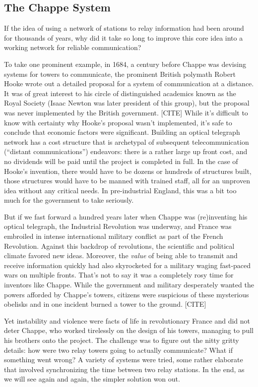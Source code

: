 \documentclass[UTF8]{book}
\begin{document}
\begin{CJK}{UTF8}{gbsn}
\subsection*{The Chappe System}

If the idea of using a network of stations to relay information had been around for thousands of years, why did it take so long to improve this core idea into a working network for reliable communication?

To take one prominent example, in 1684, a century before Chappe was devising systems for towers to communicate, the prominent British polymath Robert Hooke wrote out a detailed proposal for a system of communication at a distance. It was of great interest to his circle of distinguished academics known as the Royal Society (Isaac Newton was later president of this group), but the proposal was never implemented by the British government. [CITE] While it's difficult to know with certainty why Hooke's proposal wasn't implemented, it's safe to conclude that economic factors were significant. Building an optical telegraph network has a cost structure that is archetypal of subsequent telecommunication (``distant communications'') endeavors: there is a rather large up front cost, and no dividends will be paid until the project is completed in full. In the case of Hooke's invention, there would have to be dozens or hundreds of structures built, those structures would have to be manned with trained staff, all for an unproven idea without any critical needs. In pre-industrial England, this was a bit too much for the government to take seriously.

But if we fast forward a hundred years later when Chappe was (re)inventing his optical telegraph, the Industrial Revolution was underway, and France was embroiled in intense international military conflict as part of the French Revolution. Against this backdrop of revolutions, the scientific and political climate favored new ideas. Moreover, the \emph{value} of being able to transmit and receive information quickly had also skyrocketed for a military waging fast-paced wars on multiple fronts. That's not to say it was a completely rosy time for inventors like Chappe. While the government and military desperately wanted the powers afforded by Chappe's towers, citizens were suspicious of these mysterious obelisks and in one incident burned a tower to the ground. [CITE]

Yet instability and violence were facts of life in revolutionary France and did not deter Chappe, who worked tirelessly on the design of his towers, managing to pull his brothers onto the project. The challenge was to figure out the nitty gritty details: how were two relay towers going to actually communicate? What if something went wrong? A variety of systems were tried, some rather elaborate that involved synchronizing the time between two relay stations. In the end, as we will see again and again, the simpler solution won out.


\end{CJK}
\end{document}
